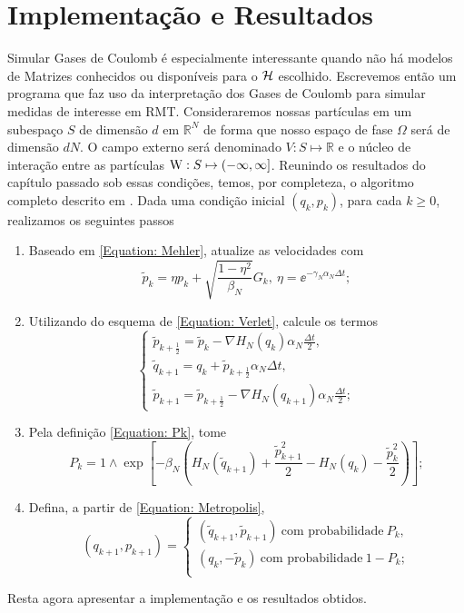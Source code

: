 \chapter{Implementação e Resultados}
\label{Capitulo: Resultados}

 Simular Gases de Coulomb é especialmente interessante quando não há modelos de Matrizes conhecidos ou disponíveis para o $\operatorname{\mathcal{H}}$ escolhido. Escrevemos então um programa que faz uso da interpretação dos Gases de Coulomb para simular medidas de interesse em RMT. Consideraremos nossas partículas em um subespaço $S$ de dimensão $d$ em $\mathbb{R}^N$ de forma que nosso espaço de fase $\Omega$ será de dimensão $dN$. O campo externo será denominado $V : S \mapsto \mathbb{R}$ e o núcleo de interação entre as partículas $\operatorname{W} : S \mapsto (-\infty, \infty]$. Reunindo os resultados do capítulo passado sob essas condições, temos, por completeza, o algoritmo completo descrito em \cite{Chafa2018}. Dada uma condição inicial $(q_k, p_k)$, para cada $k\geq0$, realizamos os seguintes passos
\begin{enumerate}
	\item Baseado em \ref{Equation: Mehler}, atualize as velocidades com
	\begin{equation}
	\tilde{p}_k = \eta p_k + \sqrt{\frac{1-\eta^2}{\beta_N}} G_k, \ \eta = \ee^{-\gamma_N \alpha_N \Delta t};
	\label{Equation: Alg Mehler}
	\end{equation}
	\item Utilizando do esquema de \ref{Equation: Verlet}, calcule os termos
	\begin{equation}
	\begin{cases}
		\tilde{p}_{k+\frac{1}{2}} = \tilde{p}_k - \nabla H_N(q_k) \alpha_N \frac{\Delta t}{2}, \\
		\tilde{q}_{k+1} = q_k + \tilde{p}_{k + \frac{1}{2}} \alpha_N \Delta t, \\
		\tilde{p}_{k+1} = \tilde{p}_{k+\frac{1}{2}} - \nabla H_N(q_{k+1}) \alpha_N \frac{\Delta t}{2};
		\label{Equation: Alg Verlet}
	\end{cases}
	\end{equation}
	\item Pela definição \ref{Equation: Pk}, tome
	\begin{equation}
	P_k = 1 \wedge \exp{\left[ -\beta_N \left(  H_N(\tilde{q}_{k+1}) + \frac{\tilde{p}^2_{k+1}}{2} - H_N(q_k) - \frac{\tilde{p}^2_k}{2} \right)\right] };
	\label{Equação: Alg Pk}
	\end{equation}
	\item Defina, a partir de \ref{Equation: Metropolis}, 
	\begin{equation}
	(q_{k+1}, p_{k+1}) = 
	\begin{cases}
		(\tilde{q}_{k+1}, \tilde{p}_{k+1}) \ \text{com probabilidade} \ P_k, \\
		(q_k, -\tilde{p}_{k}) \ \text{com probabilidade} \ 1-P_k; \\
	\end{cases}
	\label{Equation: Alg Metro}
	\end{equation}
\end{enumerate}
Resta agora apresentar a implementação e os resultados obtidos.

